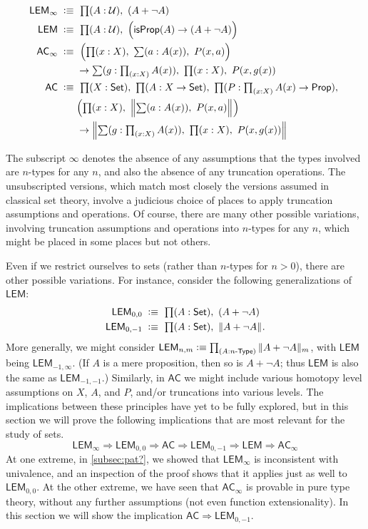 \begin{align*}
 \mathsf{LEM}_\infty\;\defeq\;&\ 
  \prd{A:\UU} (A + \neg A)\\
  \mathsf{LEM}\;\defeq\;&\ 
  \prd{A:\UU} \Big(\isprop(A) \to (A + \neg A)\Big)\\
  \mathsf{AC}_\infty\;\defeq\;&\ 
    \Big(\prd{x:X} \sm{a:A(x)} P(x,a)\Big) \\
    & \to\sm{g:\prd{x:X} A(x)} \prd{x:X} P(x,g(x))\\
   \mathsf{AC}\;\defeq\;&\ 
    \prd{X:\set}  \prd{A:X\to\set} \prd{P:\prd{x:X}A(x)\to\prop} \\
    & \Big(\prd{x:X} \Brck{\sm{a:A(x)} P(x,a)}\Big) \\
    & \to\Brck{\sm{g:\prd{x:X} A(x)} \prd{x:X} P(x,g(x))}
\end{align*}

The subscript $\infty$ denotes the absence of any assumptions that the types involved are $n$-types for any $n$, and also the absence of any truncation operations.
The unsubscripted versions, which match most closely the versions assumed in classical set theory, involve a judicious choice of places to apply truncation assumptions and operations.
Of course, there are many other possible variations, involving truncation assumptions and operations into $n$-types for any $n$, which might be placed in some places but not others.

Even if we restrict ourselves to sets (rather than $n$-types for $n>0$), there are other possible variations.
For instance, consider the following generalizations of $\mathsf{LEM}$:
%
\begin{align*}
  \mathsf{LEM}_{0,0}\;\defeq\;&\ \prd{A:\set} (A + \neg A) \\
  \mathsf{LEM}_{0,-1}\;\defeq\;&\ \prd{A:\set} \brck{A + \neg A}.
\end{align*}
%
More generally, we might consider $\mathsf{LEM}_{n,m}\defeq \prd{A:\ntype{n}} \trunc m{A+\neg A}$, with $\mathsf{LEM}$ being $\mathsf{LEM}_{-1,\infty}$.
(If $A$ is a mere proposition, then so is $A+\neg A$; thus $\mathsf{LEM}$ is also the same as $\mathsf{LEM}_{-1,-1}$.)
Similarly, in $\mathsf{AC}$ we might include various homotopy level assumptions on $X$, $A$, and $P$, and/or truncations into various levels.
The implications between these principles have yet to be fully explored, but in this section we will prove the following implications that are most relevant for the study of sets.
\[
\mathsf{LEM}_\infty \Rightarrow \mathsf{LEM}_{0,0} \Rightarrow  \mathsf{AC} \Rightarrow \mathsf{LEM}_{0,-1} \Rightarrow \mathsf{LEM}\Rightarrow \mathsf{AC}_\infty
\]
At one extreme, in \autoref{subsec:pat?}, we showed that $\mathsf{LEM}_\infty$ is inconsistent with univalence, and an inspection of the proof shows that it applies just as well to $\mathsf{LEM}_{0,0}$.
At the other extreme, we have seen that $\mathsf{AC}_\infty$ is provable in pure type theory, without any further assumptions (not even function extensionality).
In this section we will show the implication $\mathsf{AC} \Rightarrow \mathsf{LEM}_{0,-1}$.

